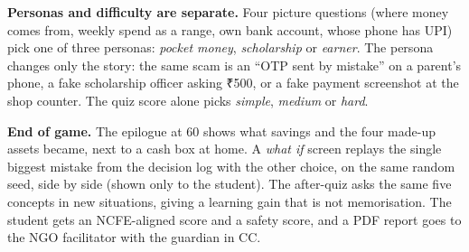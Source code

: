 \documentclass[10pt,a4paper]{article}
\newcommand{\rs}{{\rupeefont ₹}}
\begin{document}
\textbf{Personas and difficulty are separate.} Four picture questions (where money comes from, weekly spend as a range, own bank account, whose phone has UPI) pick one of three personas: \emph{pocket money}, \emph{scholarship} or \emph{earner}. The persona changes only the story: the same scam is an ``OTP sent by mistake'' on a parent's phone, a fake scholarship officer asking \rs500, or a fake payment screenshot at the shop counter. The quiz score alone picks \emph{simple}, \emph{medium} or \emph{hard}.

\textbf{End of game.} The epilogue at 60 shows what savings and the four made-up assets became, next to a cash box at home. A \emph{what if} screen replays the single biggest mistake from the decision log with the other choice, on the same random seed, side by side (shown only to the student). The after-quiz asks the same five concepts in new situations, giving a learning gain that is not memorisation. The student gets an NCFE-aligned score and a safety score, and a PDF report goes to the NGO facilitator with the guardian in CC.
\end{document}
